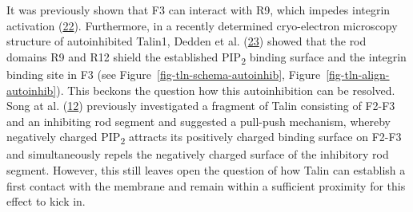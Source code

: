 \documentclass[
  twocolumn]{biophys-new-mod}
\begin{document}
It was previously shown that F3 can interact with R9, which impedes
integrin activation
(\protect\hyperlink{ref-bannoSubcellularLocalizationTalin2012}{22}).
Furthermore, in a recently determined cryo-electron microscopy structure
of autoinhibited Talin1, Dedden et al.
(\protect\hyperlink{ref-deddenArchitectureTalin1Reveals2019a}{23})
showed that the rod domains R9 and R12 shield the established
PIP\textsubscript{2} binding surface and the integrin binding site in F3
(see
Figure~\ref{fig-tln-schema-autoinhib}, Figure~\ref{fig-tln-align-autoinhib}).
This beckons the question how this autoinhibition can be resolved. Song
at al.
(\protect\hyperlink{ref-songNovelMembranedependentSwitch2012a}{12})
previously investigated a fragment of Talin consisting of F2-F3 and an
inhibiting rod segment and suggested a pull-push mechanism, whereby
negatively charged PIP\textsubscript{2} attracts its positively charged
binding surface on F2-F3 and simultaneously repels the negatively
charged surface of the inhibitory rod segment. However, this still
leaves open the question of how Talin can establish a first contact with
the membrane and remain within a sufficient proximity for this effect to
kick in.
\end{document}
